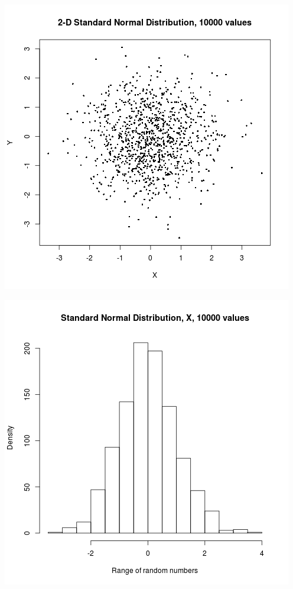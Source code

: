 \documentclass{article}
\begin{document}
\includegraphics{"plot2_3"}
\pagebreak

\includegraphics{"plot2_3_X"}
\pagebreak
\end{document}
